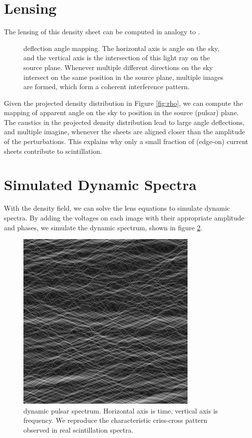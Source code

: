 \documentclass[useAMS,usenatbib]{mn2e}
\begin{document}
\section{Lensing}

The lensing of this density sheet can be computed in analogy to 
\cite{2012MNRAS.421L.132P}.

\begin{figure}
\centerline{}
\caption{deflection angle mapping. The horizontal axis is angle on the
sky, and the vertical axis is the intersection of this light ray on
the source plane.  Whenever multiple different directions on the sky
intersect on the same position in the source plane, multiple images
are formed, which form a coherent interference pattern.}
\label{fig:dt}
\end{figure}

Given the projected density distribution in Figure \ref{fig:rho}, we
can compute the mapping of apparent angle on the sky to position in the
source (pulsar) plane.  The caustics in the projected density
distribution lead to large angle deflections, and multiple imagine,
whenever the sheets are aligned closer than the amplitude of the
perturbations.  This explains why only a small fraction of (edge-on) current
sheets contribute to scintillation.

\section{Simulated Dynamic Spectra}

With the density field, we can solve the lens equations to simulate
dynamic spectra.  By adding the voltages on each image  with their
appropriate amplitude and phases, we simulate the dynamic spectrum,
shown in figure \ref{fig:ds}.

\begin{figure}
\centerline{\includegraphics[width=3.5in]{rspect.jpg}}
\caption{dynamic pulsar spectrum.  Horizontal axis is time, vertical
  axis is frequency.  We reproduce the characteristic criss-cross
  pattern observed in real scintillation spectra.}
\label{fig:ds}
\end{figure}
\end{document}

